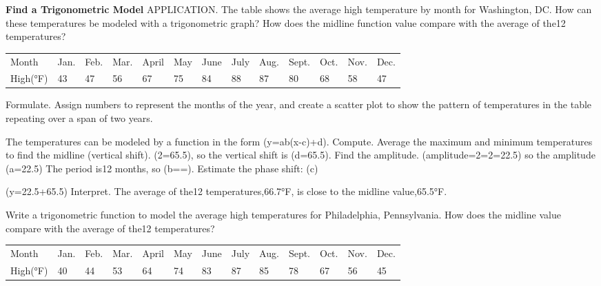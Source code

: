 \documentclass{article}
\newenvironment{example}[1]{}{}         %
\newenvironment{tryit}[1]{}{}           %
\newcommand{\answer}[1]{}               %
\newcommand{\placeholder}[2]{}          %
\newcommand{\te}[1]{}                   %
\begin{document}
\begin{example}{5}
\textbf{Find a Trigonometric Model}
APPLICATION. The table shows the average high temperature by month for Washington, DC. How can these temperatures be modeled with a trigonometric graph? How does the midline function value compare with the average of the12 temperatures?
\begin{tabular}{lllllllllllll}
Month & Jan. & Feb. & Mar. & April & May & June & July & Aug. & Sept. & Oct. & Nov. & Dec. \\
High(°F) & 43 & 47 & 56 & 67 & 75 & 84 & 88 & 87 & 80 & 68 & 58 & 47 \\
\end{tabular}
Formulate. Assign numbers to represent the months of the year, and create a scatter plot to show the pattern of temperatures in the table repeating over a span of two years.
\placeholder{graph}{Washington D.C. Average High Temperature(°F), blue scatterplot x,y arrowed axes; x labels0,4,8,12,16,20,24,grid1; y labels30,50,70,90,grid10,window0..24,30..100. Points at integer months1..12 with y43,47,56,67,75,84,88,87,80,68,58,47, repeated at13..24.}
The temperatures can be modeled by a function in the form (y=a\sin b(x-c)+d).
Compute. Average the maximum and minimum temperatures to find the midline (vertical shift). (2=65.5), so the vertical shift is (d=65.5).
Find the amplitude.
(amplitude=\frac{\max-\min}2=2=22.5)
so the amplitude (a=22.5)
The period is12 months, so (b==\frac{}).
Estimate the phase shift: (c)
\te{Callout: Determine the phase shift by looking for the point where the graph crosses the midline. In the parent function, there is a zero exactly at the origin.}
(y=22.5\sin[\frac\pi6(x-4)]+65.5)
Interpret. The average of the12 temperatures,66.7°F, is close to the midline value,65.5°F.
\answer{(y=22.5\sin[\frac\pi6(x-4)]+65.5); average66.7°F close to midline65.5°F.}
\end{example}
\begin{tryit}{5}
Write a trigonometric function to model the average high temperatures for Philadelphia, Pennsylvania. How does the midline value compare with the average of the12 temperatures?
\begin{tabular}{lllllllllllll}
Month & Jan. & Feb. & Mar. & April & May & June & July & Aug. & Sept. & Oct. & Nov. & Dec. \\
High(°F) & 40 & 44 & 53 & 64 & 74 & 83 & 87 & 85 & 78 & 67 & 56 & 45 \\
\end{tabular}
\answer{(y=23.5\sin(\frac\pi6(x-4))+63.5); The average of the12 temperatures,64.7°F,is close to the midline value,63.5°F.}
\end{tryit}
\end{document}
